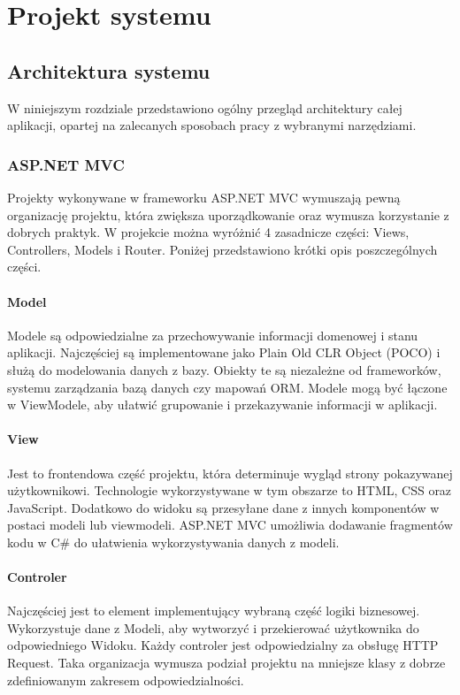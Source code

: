 \documentclass{article}
\begin{document}
\section{Projekt systemu}

\subsection{Architektura systemu} \label{Architektura systemu}

W niniejszym rozdziale przedstawiono ogólny przegląd architektury całej aplikacji, opartej na zalecanych sposobach pracy z wybranymi narzędziami.

\subsubsection{ASP.NET MVC}

Projekty wykonywane w frameworku ASP.NET MVC wymuszają pewną organizację projektu, która zwiększa uporządkowanie oraz wymusza korzystanie z dobrych praktyk. W projekcie można wyróżnić 4 zasadnicze części: Views, Controllers, Models i Router. Poniżej przedstawiono krótki opis poszczególnych części.

\paragraph{Model}
Modele są odpowiedzialne za przechowywanie informacji domenowej i stanu aplikacji. Najczęściej są implementowane jako Plain Old CLR Object (POCO) i służą do modelowania danych z bazy. Obiekty te są niezależne od frameworków, systemu zarządzania bazą danych czy mapowań ORM. Modele mogą być łączone w ViewModele, aby ułatwić grupowanie i przekazywanie informacji w aplikacji.

\paragraph{View}
Jest to frontendowa część projektu, która determinuje wygląd strony pokazywanej użytkownikowi. Technologie wykorzystywane w tym obszarze to HTML, CSS oraz JavaScript. Dodatkowo do widoku są przesyłane dane z innych komponentów w postaci modeli lub viewmodeli. ASP.NET MVC umożliwia dodawanie fragmentów kodu w C\# do ułatwienia wykorzystywania danych z modeli.

\paragraph{Controler}
Najczęściej jest to element implementujący wybraną część logiki biznesowej. Wykorzystuje dane z Modeli, aby wytworzyć i przekierować użytkownika do odpowiedniego Widoku. Każdy controler jest odpowiedzialny za obsługę HTTP Request. Taka organizacja wymusza podział projektu na mniejsze klasy z dobrze zdefiniowanym zakresem odpowiedzialności.
\end{document}
